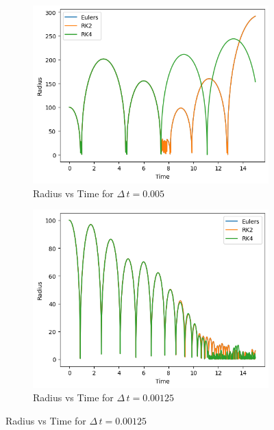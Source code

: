 \documentclass[12pt]{article}
\begin{document}
\begin{figure}[H]
    \centering
    \begin{subfigure}[h]{0.495\textwidth}
        \includegraphics[width=\textwidth]{out/dt_variance/Question_2/dt_0.005/combined_graph.png}
        \caption{Radius vs Time for $\Delta\,t = 0.005$}
        \label{fig:part_2_0.005}
    \end{subfigure}
    \hfill
    \begin{subfigure}[h]{0.495\textwidth}
        \includegraphics[width=\textwidth]{out/dt_variance/Question_2/dt_0.00125/combined_graph.png}
        \caption{Radius vs Time for $\Delta\,t = 0.00125$}
        \label{fig:part_2_0.00125}
    \end{subfigure}

\end{figure}
\end{document}
